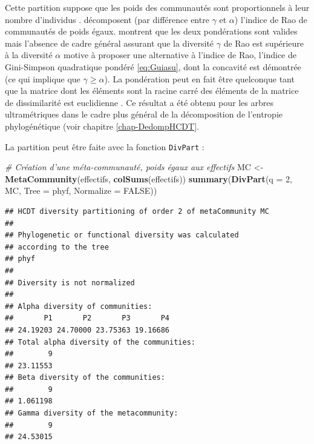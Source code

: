 \documentclass[
  11pt,
  french,
  a4paper,
  extrafontsizes,onecolumn,openright
  ]{memoir}
\newenvironment{Shaded}{\begin{snugshade}}{\end{snugshade}}
\newcommand{\CommentTok}[1]{\textcolor[rgb]{0.56,0.35,0.01}{\textit{#1}}}
\newcommand{\DataTypeTok}[1]{\textcolor[rgb]{0.13,0.29,0.53}{#1}}
\newcommand{\DecValTok}[1]{\textcolor[rgb]{0.00,0.00,0.81}{#1}}
\newcommand{\KeywordTok}[1]{\textcolor[rgb]{0.13,0.29,0.53}{\textbf{#1}}}
\newcommand{\NormalTok}[1]{#1}
\newcommand{\OtherTok}[1]{\textcolor[rgb]{0.56,0.35,0.01}{#1}}
\newcommand{\StringTok}[1]{\textcolor[rgb]{0.31,0.60,0.02}{#1}}
\begin{document}
Cette partition suppose que les poids des communautés sont proportionnels à leur nombre d'individus \autocite{Rao1982,Villeger2008}.
\textcite{Hardy2007} décomposent (par différence entre \(\gamma\) et \(\alpha\)) l'indice de Rao de communautés de poids égaux.
\textcite{Hardy2008} montrent que les deux pondérations sont valides mais l'absence de cadre général assurant que la diversité \(\gamma\) de Rao est supérieure à la diversité \(\alpha\) \autocite{DeBello2010} motive \textcite{Guiasu2011} à proposer une alternative à l'indice de Rao, l'indice de Gini-Simpson quadratique pondéré \eqref{eq:Guiasu}, dont la concavité est démontrée (ce qui implique que \(\gamma\ge \alpha\)).
La pondération peut en fait être quelconque tant que la matrice dont les éléments sont la racine carré des éléments de la matrice de dissimilarité est euclidienne \autocite{Champely2002}.
Ce résultat a été obtenu pour les arbres ultramétriques dans le cadre plus général de la décomposition de l'entropie phylogénétique (voir chapitre \ref{chap-DedompHCDT}.

La partition peut être faite avec la fonction \texttt{DivPart} :

\scriptsize

\begin{Shaded}
\begin{Highlighting}[]
\CommentTok{# Création d'une méta-communauté, poids égaux aux effectifs}
\NormalTok{MC <-}\StringTok{ }\KeywordTok{MetaCommunity}\NormalTok{(effectifs, }\KeywordTok{colSums}\NormalTok{(effectifs))}
\KeywordTok{summary}\NormalTok{(}\KeywordTok{DivPart}\NormalTok{(}\DataTypeTok{q =} \DecValTok{2}\NormalTok{, MC, }\DataTypeTok{Tree =}\NormalTok{ phyf, }\DataTypeTok{Normalize =} \OtherTok{FALSE}\NormalTok{))}
\end{Highlighting}
\end{Shaded}

\begin{verbatim}
## HCDT diversity partitioning of order 2 of metaCommunity MC
## 
## Phylogenetic or functional diversity was calculated
## according to the tree 
## phyf 
## 
## Diversity is not normalized 
## 
## Alpha diversity of communities: 
##       P1       P2       P3       P4 
## 24.19203 24.70000 23.75363 19.16686 
## Total alpha diversity of the communities: 
##        9 
## 23.11553 
## Beta diversity of the communities: 
##        9 
## 1.061198 
## Gamma diversity of the metacommunity: 
##        9 
## 24.53015
\end{verbatim}

\normalsize
\end{document}
